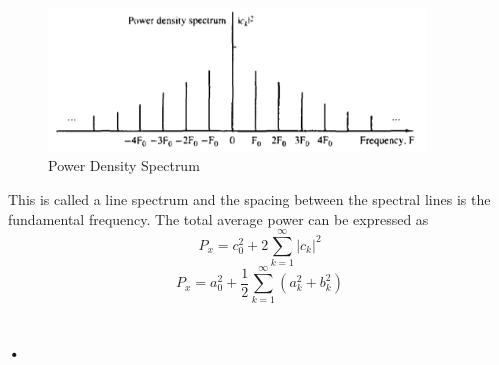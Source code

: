 \documentclass{article} %
\begin{document}
	\begin{figure}[h]
    \centering
	\includegraphics[width=10cm]{pds}
	\caption{Power Density Spectrum}
	\end{figure}
	
	This is called a line spectrum and the spacing between the spectral lines is the fundamental frequency. The total average power can be expressed as 
	\begin{equation}
 	P_x = c_0^2 + 2\sum_{k=1}^{\infty}|c_k|^2
	\end{equation}
	\begin{equation}
 	P_x = a_0^2 + \frac{1}{2}\sum_{k=1}^{\infty}(a_k^2 + b_k^2)
	\end{equation}
	\\
	\\
	\textbf{•}

	
\end{document}
